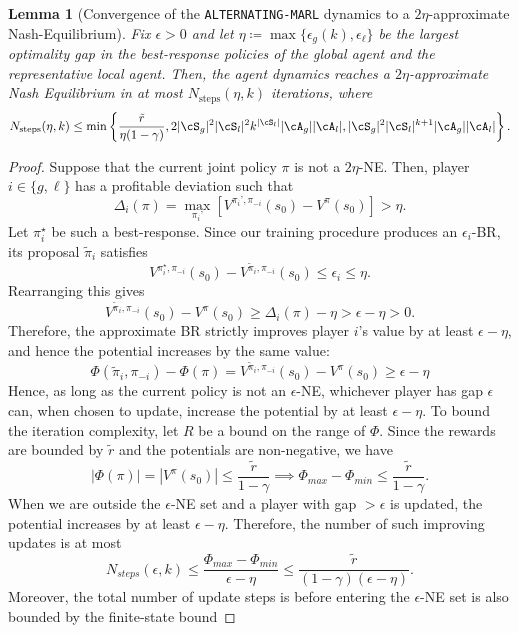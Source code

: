 \documentclass{article}
\theoremstyle{plain}
\newtheorem{lemma}[theorem]{Lemma}
\theoremstyle{definition}
\begin{document}
\begin{lemma}[Convergence of the \texttt{ALTERNATING-MARL} dynamics to a $2\eta$-approximate Nash-Equilibrium]\label{lemma: bound nsteps} Fix $\epsilon>0$ and let $\eta \coloneqq \max\{\epsilon_g(k), \epsilon_\ell\}$ be the largest optimality gap in the best-response policies of the global agent and the representative local agent.  Then, the agent dynamics reaches a $2\eta$-approximate Nash Equilibrium in at most $N_{\text{steps}}(\eta, k)$ iterations, where \begin{equation} N_{\text{steps}}(\eta, k) \leq \min\left\{\frac{\tilde{r}}{\eta(1-\gamma)}, 2|\cS_g|^2 |\cS_l|^2 k^{|\cS_l|} |\cA_g| |\cA_l|, |\cS_g|^2 |\cS_l|^{k+1} |\cA_g| |\cA_l| \right\}.\end{equation}
\end{lemma}
\begin{proof} Suppose that the current joint policy $\pi$ is not a $2\eta$-NE. Then, player $i\in \{g,\ell\}$ has a profitable deviation such that
\[\Delta_i(\pi) = \max_{\pi_i’} \left[V^{\pi_i’, \pi_{-i}}(s_0) - V^\pi(s_0)\right] > \eta.\]
Let $\pi_i^\star$ be such a best-response. Since our training procedure produces an $\epsilon_i$-BR, its proposal $\tilde{\pi}_i$ satisfies
\[V^{\pi_i^\star, \pi_{-i}}(s_0) - V^{\tilde{\pi}_i, \pi_{-i}}(s_0) \leq \epsilon_i \leq \eta.\]
Rearranging this gives
\[V^{\tilde{\pi}_i, \pi_{-i}}(s_0) - V^\pi(s_0) \geq \Delta_i(\pi) - \eta > \epsilon - \eta > 0.\]
Therefore, the approximate BR strictly improves player $i$’s value by at least $\epsilon - \eta$, and hence the potential increases by the same value:
\[\Phi(\tilde{\pi}_{i}, \pi_{-i}) - \Phi(\pi) = V^{\tilde{\pi}_i, \pi_{-i}}(s_0) - V^\pi(s_0) \geq \epsilon - \eta\]
Hence, as long as the current policy is not an $\epsilon$-NE, whichever player has gap $\epsilon$ can, when chosen to update, increase the potential by at least $\epsilon - \eta$. To bound the iteration complexity, let $R$ be a bound on the range of $\Phi$. Since the rewards are bounded by $\tilde{r}$ and the potentials are non-negative, we have
\[|\Phi(\pi)| = |V^{\pi}(s_0)| \leq \frac{\tilde{r}}{1-\gamma} 
\implies \Phi_{max} - \Phi_{min} \leq \frac{\tilde{r}}{1-\gamma}.\] 
When we are outside the $\epsilon$-NE set and a player with gap $> \epsilon$ is updated, the potential increases by at least $\epsilon - \eta$. Therefore, the number of such improving updates is at most
\[N_{steps}(\epsilon,k) \leq \frac{\Phi_{max} - \Phi_{min}}{\epsilon-\eta} \leq \frac{\tilde{r}}{(1-\gamma)(\epsilon-\eta)}.\]
Moreover, the total number of update steps is before entering the $\epsilon$-NE set is also bounded by the finite‑state bound 

\end{proof}
\end{document}
